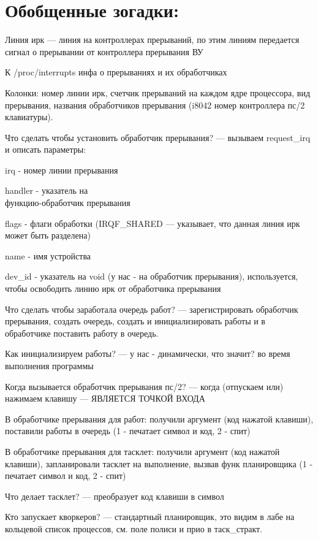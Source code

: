 \section*{Обобщенные зогадки:}

Линия ирк --- линия на контроллерах прерываний, по этим линиям передается сигнал о прерывании от контроллера прерывания ВУ

К /proc/interrupts инфа о прерываниях и их обработчиках

Колонки: номер линии ирк, счетчик прерываний на каждом ядре процессора, вид прерывания, названия обработчиков прерывания (i8042 номер контроллера пс/2 клавиатуры).

Что сделать чтобы установить обработчик прерывания? --- вызываем request\_irq и описать параметры: 

irq - номер линии прерывания

handler - указатель на \\  функцию-обработчик прерывания

flags - флаги обработки (IRQF\_SHARED --- указывает, что данная линия ирк может быть разделена)

name - имя устройства

dev\_id - указатель на void (у нас - на обработчик прерывания), используется, чтобы освободить линию ирк от обработчика прерывания

Что сделать чтобы заработала очередь работ? --- зарегистрировать обработчик прерывания, создать очередь, создать и инициализировать работы и в обработчике поставить работу в очередь.

Как инициализируем работы? --- у нас - динамически, что значит? во время выполнения программы

Когда вызывается обработчик прерывания пс/2? --- когда (отпускаем или) нажимаем клавишу --- ЯВЛЯЕТСЯ ТОЧКОЙ ВХОДА

В обработчике прерывания для работ: получили аргумент (код нажатой клавиши), поставили работы в очередь (1 - печатает символ и код, 2 - спит)

В обработчике прерывания для тасклет: получили аргумент (код нажатой клавиши), запланировали тасклет на выполнение, вызвав функ планировщика (1 - печатает символ и код, 2 - спит)

Что делает тасклет? --- преобразует код клавиши в символ

Кто запускает кворкеров? --- стандартный планировщик, это видим в лабе на кольцевой список процессов, см. поле полиси и прио в таск\_стракт.



